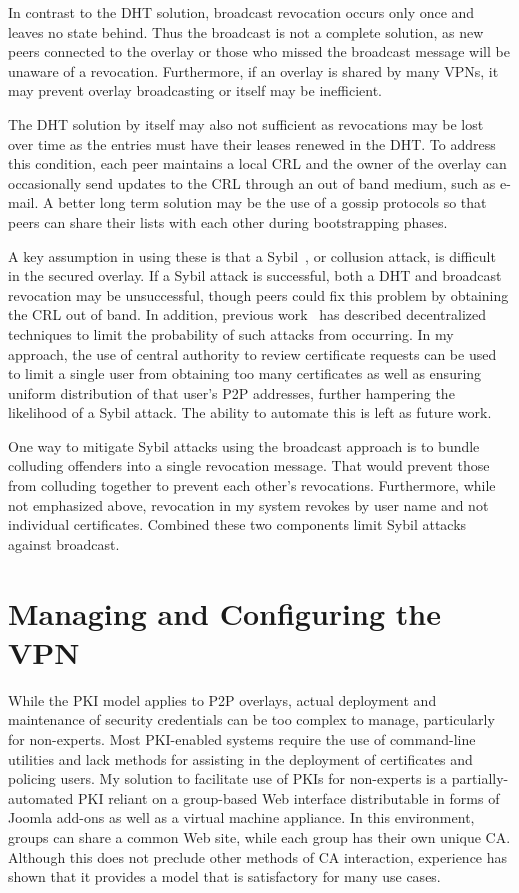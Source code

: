 In contrast to the DHT solution, broadcast revocation occurs only once and
leaves no state behind.  Thus the broadcast is not a complete solution, as new
peers connected to the overlay or those who missed the broadcast message will
be unaware of a revocation.  Furthermore, if an overlay is shared by many VPNs,
it may prevent overlay broadcasting or itself may be inefficient.

The DHT solution by itself may also not sufficient as revocations may be lost
over time as the entries must have their leases renewed in the DHT.  To address
this condition, each peer maintains a local CRL and the owner of the overlay
can occasionally send updates to the CRL through an out of band medium, such as
e-mail.  A better long term solution may be the use of a gossip protocols so
that peers can share their lists with each other during bootstrapping phases.

A key assumption in using these is that a Sybil~\cite{Sybil}, or collusion
attack, is difficult in the secured overlay.	 If a Sybil attack is successful,
both a DHT and broadcast revocation may be unsuccessful, though peers could fix
this problem by obtaining the CRL out of band.  In addition, previous
work~\cite{secure_routing} has described decentralized techniques to limit the
probability of such attacks from occurring.  In my approach, the use of central
authority to review certificate requests can be used to limit a single user
from obtaining too many certificates as well as ensuring uniform distribution
of that user's P2P addresses, further hampering the likelihood of a Sybil
attack.  The ability to automate this is left as future work.

One way to mitigate Sybil attacks using the broadcast approach is to bundle
colluding offenders into a single revocation message.  That would prevent those
from colluding together to prevent each other's revocations.  Furthermore,
while not emphasized above, revocation in my system revokes by user name and
not individual certificates.  Combined these two components limit Sybil attacks
against broadcast.

\section{Managing and Configuring the VPN}
\label{vpn:groupvpn}

While the PKI model applies to P2P overlays, actual deployment and maintenance
of security credentials can be too complex to manage, particularly for
non-experts.  Most PKI-enabled systems require the use of command-line
utilities and lack methods for assisting in the deployment of certificates and
policing users.  My solution to facilitate use of PKIs for non-experts is a
partially-automated PKI reliant on a group-based Web interface distributable in
forms of Joomla add-ons as well as a virtual machine appliance.  In this
environment, groups can share a common Web site, while each group has their own
unique CA.  Although this does not preclude other methods of CA interaction,
experience has shown that it provides a model that is satisfactory for many use
cases.

